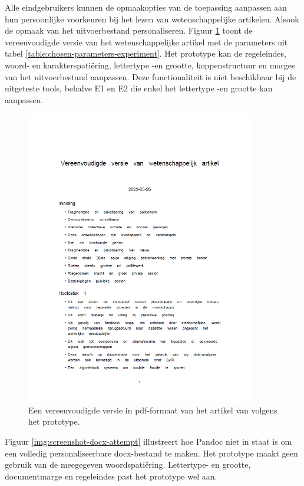 \medspace

Alle eindgebruikers kunnen de opmaakopties van de toepassing aanpassen aan hun persoonlijke voorkeuren bij het lezen van wetenschappelijke artikelen. Alsook de opmaak van het uitvoerbestand personaliseren. Figuur \ref{img:screenshot-pdf-attempt} toont de vereenvoudigde versie van het wetenschappelijke artikel met de parameters uit tabel \ref{table:chosen-parameters-experiment}. Het prototype kan de regeleindes, woord- en karakterspatiëring, lettertype -en grootte, koppenstructuur en marges van het uitvoerbestand aanpassen. Deze functionaliteit is niet beschikbaar bij de uitgeteste tools, behalve E1 en E2 die enkel het lettertype -en grootte kan aanpassen. 

\begin{figure}
	\includegraphics[width=10cm]{img/screenshot-prototype-pdf.png}
	\caption{Een vereenvoudigde versie in pdf-formaat van het artikel van \textcite{VanBrakel2022} volgens het prototype.}
	\label{img:screenshot-pdf-attempt}
\end{figure}

Figuur \ref{img:screenshot-docx-attempt} illustreert hoe Pandoc niet in staat is om een volledig personaliseerbare docx-bestand te maken. Het prototype maakt geen gebruik van de meegegeven woordspatiëring. Lettertype- en grootte, documentmarge en regeleindes past het prototype wel aan.

